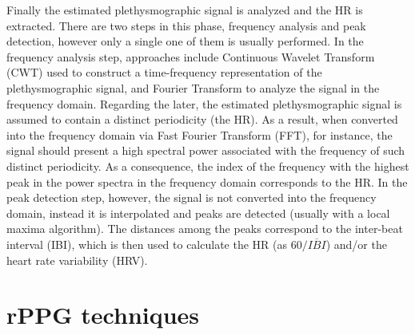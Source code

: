 Finally the estimated plethysmographic signal is analyzed and the HR is extracted. There are two steps in this phase, frequency analysis and peak detection, however only a single one of them is usually performed. In the frequency analysis step, approaches include Continuous Wavelet Transform (CWT) used to construct a time-frequency representation of the plethysmographic signal, and Fourier Transform to analyze the signal in the frequency domain. Regarding the later, the estimated plethysmographic signal is assumed to contain a distinct periodicity (the HR). As a result, when converted into the frequency domain via Fast Fourier Transform (FFT), for instance, the signal should present a high spectral power associated with the frequency of such distinct periodicity. As a consequence, the index of the frequency with the highest peak in the power spectra in the frequency domain corresponds to the HR. In the peak detection step, however, the signal is not converted into the frequency domain, instead it is interpolated and peaks are detected (usually with a local maxima algorithm). The distances among the peaks correspond to the inter-beat interval (IBI), which is then used to calculate the HR (as $60/\overline{IBI}$) and/or the heart rate variability (HRV).

\section{rPPG techniques}


